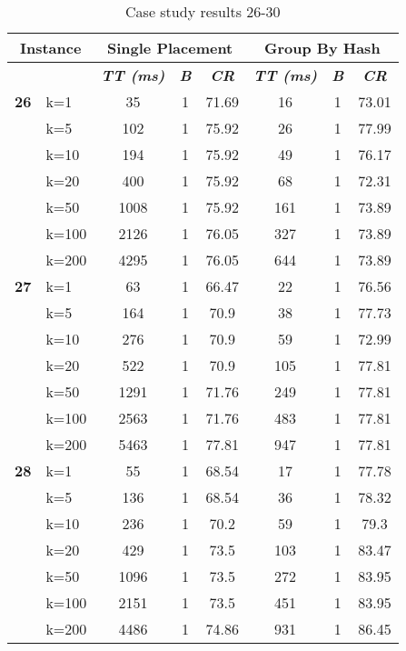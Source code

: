     \begin{table}[htbp]
    \caption{Case study results 26-30}
    \centering
    \begin{tabular}{|l|l|c|c|c|c|c|c|}
    \hline
    \multicolumn{ 2}{|c|}{\textbf{Instance}} & \multicolumn{ 3}{c|}{\textbf{Single Placement}} & \multicolumn{ 3}{c|}{\textbf{Group By Hash}} \\ \hline
    \multicolumn{ 2}{|l|}{} & \textbf{\textit{TT (ms)}} & \textbf{\textit{B}} & \textbf{\textit{CR}} & \textbf{\textit{TT (ms)}} & \textbf{\textit{B}} & \textbf{\textit{CR}} \\ \hline
    \multicolumn{1}{|r|}{\textbf{26}} & k=1 & 35 & 1 & 71.69 & 16 & 1 & 73.01 \\ 
     & k=5 & 102 & 1 & 75.92 & 26 & 1 & 77.99 \\ 
     & k=10 & 194 & 1 & 75.92 & 49 & 1 & 76.17 \\ 
     & k=20 & 400 & 1 & 75.92 & 68 & 1 & 72.31 \\ 
     & k=50 & 1008 & 1 & 75.92 & 161 & 1 & 73.89 \\ 
     & k=100 & 2126 & 1 & 76.05 & 327 & 1 & 73.89 \\ 
     & k=200 & 4295 & 1 & 76.05 & 644 & 1 & 73.89 \\ \hline
    \multicolumn{1}{|r|}{\textbf{27}} & k=1 & 63 & 1 & 66.47 & 22 & 1 & 76.56 \\ 
     & k=5 & 164 & 1 & 70.9 & 38 & 1 & 77.73 \\ 
     & k=10 & 276 & 1 & 70.9 & 59 & 1 & 72.99 \\ 
     & k=20 & 522 & 1 & 70.9 & 105 & 1 & 77.81 \\ 
     & k=50 & 1291 & 1 & 71.76 & 249 & 1 & 77.81 \\ 
     & k=100 & 2563 & 1 & 71.76 & 483 & 1 & 77.81 \\ 
     & k=200 & 5463 & 1 & 77.81 & 947 & 1 & 77.81 \\ \hline
    \multicolumn{1}{|r|}{\textbf{28}} & k=1 & 55 & 1 & 68.54 & 17 & 1 & 77.78 \\ 
     & k=5 & 136 & 1 & 68.54 & 36 & 1 & 78.32 \\ 
     & k=10 & 236 & 1 & 70.2 & 59 & 1 & 79.3 \\ 
     & k=20 & 429 & 1 & 73.5 & 103 & 1 & 83.47 \\ 
     & k=50 & 1096 & 1 & 73.5 & 272 & 1 & 83.95 \\ 
     & k=100 & 2151 & 1 & 73.5 & 451 & 1 & 83.95 \\ 
     & k=200 & 4486 & 1 & 74.86 & 931 & 1 & 86.45 \\ \hline

\end{tabular}
\end{table}
